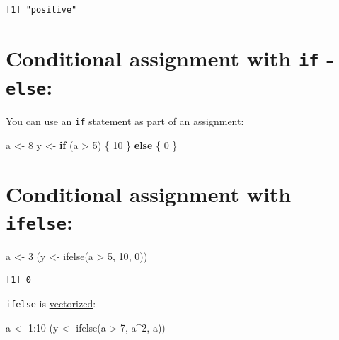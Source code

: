 \documentclass[
]{book}
\newenvironment{Shaded}{\begin{snugshade}}{\end{snugshade}}
\newcommand{\ControlFlowTok}[1]{\textcolor[rgb]{0.13,0.29,0.53}{\textbf{#1}}}
\newcommand{\DecValTok}[1]{\textcolor[rgb]{0.00,0.00,0.81}{#1}}
\newcommand{\FunctionTok}[1]{\textcolor[rgb]{0.00,0.00,0.00}{#1}}
\newcommand{\NormalTok}[1]{#1}
\newcommand{\OtherTok}[1]{\textcolor[rgb]{0.56,0.35,0.01}{#1}}
\newcommand{\SpecialCharTok}[1]{\textcolor[rgb]{0.00,0.00,0.00}{#1}}
\begin{document}
\begin{verbatim}
[1] "positive"
\end{verbatim}

\hypertarget{conditional-assignment-with-if---else}{%
\section{\texorpdfstring{Conditional assignment with \texttt{if} - \texttt{else}:}{Conditional assignment with if - else:}}\label{conditional-assignment-with-if---else}}

You can use an \texttt{if} statement as part of an assignment:

\begin{Shaded}
\begin{Highlighting}[]
\NormalTok{a }\OtherTok{\textless{}{-}} \DecValTok{8}
\NormalTok{y }\OtherTok{\textless{}{-}} \ControlFlowTok{if}\NormalTok{ (a }\SpecialCharTok{\textgreater{}} \DecValTok{5}\NormalTok{) \{}
  \DecValTok{10}
\NormalTok{\} }\ControlFlowTok{else}\NormalTok{ \{}
  \DecValTok{0}
\NormalTok{\}}
\end{Highlighting}
\end{Shaded}

\hypertarget{conditional-assignment-with-ifelse}{%
\section{\texorpdfstring{Conditional assignment with \texttt{ifelse}:}{Conditional assignment with ifelse:}}\label{conditional-assignment-with-ifelse}}

\begin{Shaded}
\begin{Highlighting}[]
\NormalTok{a }\OtherTok{\textless{}{-}} \DecValTok{3}
\NormalTok{(y }\OtherTok{\textless{}{-}} \FunctionTok{ifelse}\NormalTok{(a }\SpecialCharTok{\textgreater{}} \DecValTok{5}\NormalTok{, }\DecValTok{10}\NormalTok{, }\DecValTok{0}\NormalTok{))}
\end{Highlighting}
\end{Shaded}

\begin{verbatim}
[1] 0
\end{verbatim}

\texttt{ifelse} is \protect\hyperlink{vectorization}{vectorized}:

\begin{Shaded}
\begin{Highlighting}[]
\NormalTok{a }\OtherTok{\textless{}{-}} \DecValTok{1}\SpecialCharTok{:}\DecValTok{10}
\NormalTok{(y }\OtherTok{\textless{}{-}} \FunctionTok{ifelse}\NormalTok{(a }\SpecialCharTok{\textgreater{}} \DecValTok{7}\NormalTok{, a}\SpecialCharTok{\^{}}\DecValTok{2}\NormalTok{, a))}
\end{Highlighting}
\end{Shaded}
\end{document}
